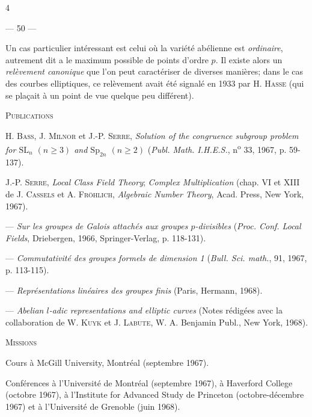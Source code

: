 4

\begin{center}--- 50 ---\end{center}

Un cas particulier intéressant est celui où la variété abélienne est \textit{ordinaire}, autrement dit a le maximum possible de points d'ordre $p$. Il existe alors un \textit{relèvement canonique} que l'on peut caractériser de diverses manières; dans le cas des courbes elliptiques, ce relèvement avait été signalé en 1933 par H. \textsc{Hasse} (qui se plaçait à un point de vue quelque peu différent).

\begin{center}\textsc{Publications}\end{center}

H. \textsc{Bass}, J. \textsc{Milnor} et J.-P. \textsc{Serre}, \textit{Solution of the congruence subgroup problem for $\mathrm{SL}_n$ $(n\geq3)$ and $\mathrm{Sp}_{2n}$ $(n\geq2)$} (\textit{Publ. Math. I.H.E.S.}, n\textsuperscript{o} 33, 1967, p. 59-137).

J.-P. \textsc{Serre}, \textit{Local Class Field Theory}; \textit{Complex Multiplication} (chap. VI et XIII de J. \textsc{Cassels} et A. \textsc{Fröhlich}, \textit{Algebraic Number Theory}, Acad. Press, New York, 1967).

--- \textit{Sur les groupes de Galois attachés aux groupes $p$-divisibles} (\textit{Proc. Conf. Local Fields}, Driebergen, 1966, Springer-Verlag, p. 118-131).

--- \textit{Commutativité des groupes formels de dimension 1} (\textit{Bull. Sci. math.}, 91, 1967, p. 113-115).

--- \textit{Représentations linéaires des groupes finis} (Paris, Hermann, 1968).

--- \textit{Abelian $l$-adic representations and elliptic curves} (Notes rédigées avec la collaboration de W. \textsc{Kuyk} et J. \textsc{Labute}, W. A. Benjamin Publ., New York, 1968).

\begin{center}\textsc{Missions}\end{center}

Cours à McGill University, Montréal (septembre 1967).

Conférences à l'Université de Montréal (septembre 1967), à Haverford College (octobre 1967), à l'Institute for Advanced Study de Princeton (octobre-décembre 1967) et à l'Université de Grenoble (juin 1968).

